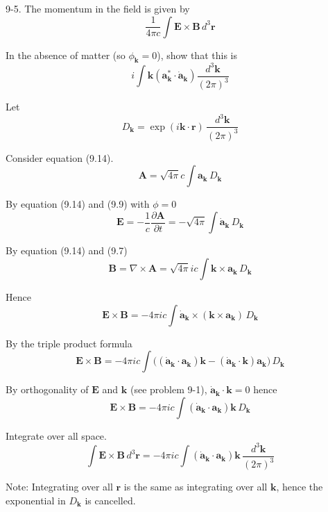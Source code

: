 \documentclass[12pt]{article}
\begin{document}
9-5.
The momentum in the field is given by
\begin{equation*}
\frac{1}{4\pi c}\int
\mathbf E\times\mathbf B\,d^3\mathbf r
\end{equation*}

In the absence of matter (so $\phi_{\mathbf k}=0$),
show that this is
\begin{equation*}
i\int\mathbf k\left(\mathbf a_{\mathbf k}^*\cdot\dot{\mathbf a}_{\mathbf k}\right)
\frac{d^3\mathbf k}{(2\pi)^3}
\end{equation*}

Let
\begin{equation*}
D_{\mathbf k}=\exp(i\mathbf k\cdot\mathbf r)\,\frac{d^3\mathbf k}{(2\pi)^3}
\end{equation*}

Consider equation (9.14).
\begin{equation*}
\mathbf A=\sqrt{4\pi}c\int\mathbf a_{\mathbf k}\,D_{\mathbf k}
\tag{9.14}
\end{equation*}

By equation (9.14) and (9.9) with $\phi=0$
\begin{equation*}
\mathbf E=-\frac{1}{c}\frac{\partial\mathbf A}{\partial t}
=-\sqrt{4\pi}\int\dot{\mathbf a}_{\mathbf k}\,D_{\mathbf k}
\end{equation*}

By equation (9.14) and (9.7)
\begin{equation*}
\mathbf B=\nabla\times\mathbf A
=\sqrt{4\pi}ic\int\mathbf k\times\mathbf a_{\mathbf k}\,D_{\mathbf k}
\end{equation*}

Hence
\begin{equation*}
\mathbf E\times\mathbf B=-4\pi ic\int
\dot{\mathbf a}_{\mathbf k}
\times\left(\mathbf k\times\mathbf a_{\mathbf k}\right)\,D_{\mathbf k}
\end{equation*}

By the triple product formula
\begin{equation*}
\mathbf E\times\mathbf B=-4\pi ic\int
\big(
(\dot{\mathbf a}_{\mathbf k}\cdot\mathbf a_{\mathbf k})\mathbf k
-(\dot{\mathbf a}_{\mathbf k}\cdot\mathbf k)\mathbf a_{\mathbf k}
\big)\,D_{\mathbf k}
\end{equation*}

By orthogonality of $\mathbf E$ and $\mathbf k$ (see problem 9-1),
$\dot{\mathbf a}_{\mathbf k}\cdot\mathbf k=0$ hence
\begin{equation*}
\mathbf E\times\mathbf B
=-4\pi ic\int(\dot{\mathbf a}_{\mathbf k}\cdot\mathbf a_{\mathbf k})\mathbf k
\,D_{\mathbf k}
\end{equation*}

Integrate over all space.
\begin{equation*}
\int\mathbf E\times\mathbf B
\,d^3\mathbf r
=-4\pi ic\int(\dot{\mathbf a}_{\mathbf k}\cdot\mathbf a_{\mathbf k})\mathbf k
\,\frac{d^3\mathbf k}{(2\pi)^3}
\end{equation*}

Note: Integrating over all $\mathbf r$ is the same as integrating over all $\mathbf k$,
hence the exponential in $D_{\mathbf k}$ is cancelled.
\end{document}
